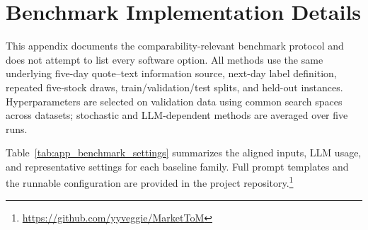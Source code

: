 \documentclass[a4paper,fleqn,doubleblind]{cas-sc}
\newcommand{\revise}[1]{{\color{blue}#1}}
\begin{document}
% 


\let\oldbibliography\thebibliography
\renewcommand{\thebibliography}[1]{%
\oldbibliography{#1}%
\baselineskip8pt 
\setlength{\itemsep}{3pt}
}




% 


\newpage
\appendix


\section{Benchmark Implementation Details}
\label{app:benchmark_implementation}
This appendix documents the comparability-relevant benchmark protocol and does not attempt to list every software option. All methods use the same underlying five-day quote--text information source, next-day label definition, repeated five-stock draws, train/validation/test splits, and held-out instances. Hyperparameters are selected on validation data using common search spaces across datasets; stochastic and LLM-dependent methods are averaged over five runs.

Table~\ref{tab:app_benchmark_settings} summarizes the aligned inputs, LLM usage, and representative settings for each baseline family. \revise{Full prompt templates and the runnable configuration are provided in the project repository.\footnote{\url{https://github.com/yyveggie/MarketToM}}}
\end{document}
